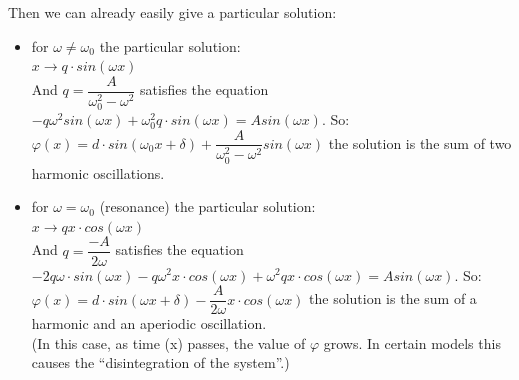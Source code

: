 \documentclass[margin=0px]{article}
\begin{document}
\begin{description}
        Then we can already easily give a particular solution:
        \begin{itemize}
            \item for $\omega \neq \omega_0$ the particular solution: \\
                  $ x \rightarrow q\cdot sin(\omega x) $\\
                  And $ q = \dfrac{A}{\omega_0^2-\omega^2} $ satisfies the equation $-q\omega^2sin(\omega x)+\omega_0^2q\cdot sin(\omega x) = Asin(\omega x) $.
                  So: \\
                  $ \varphi(x) = d\cdot sin(\omega_0x + \delta)+\dfrac{A}{\omega_0^2-\omega^2}sin(\omega x) $ the solution is the sum of two harmonic oscillations.
            \item for $ \omega = \omega_0 $ (resonance) the particular solution: \\
                  $ x \rightarrow qx\cdot cos(\omega x) $\\
                  And $ q = \dfrac{-A}{2\omega} $ satisfies the equation $-2q\omega \cdot sin(\omega x)- q\omega^2x\cdot cos(\omega x) +\omega^2qx\cdot cos(\omega x) = Asin(\omega x) $.
                  So: \\
                  $ \varphi(x) = d\cdot sin(\omega x + \delta)-\dfrac{A}{2\omega}x\cdot cos(\omega x) $ the solution is the sum of a harmonic and an aperiodic oscillation.\\
                  (In this case, as time (x) passes, the value of $\varphi $ grows. In certain models this causes the ``disintegration of the system''.)
        \end{itemize}
\end{description}
\end{document}
